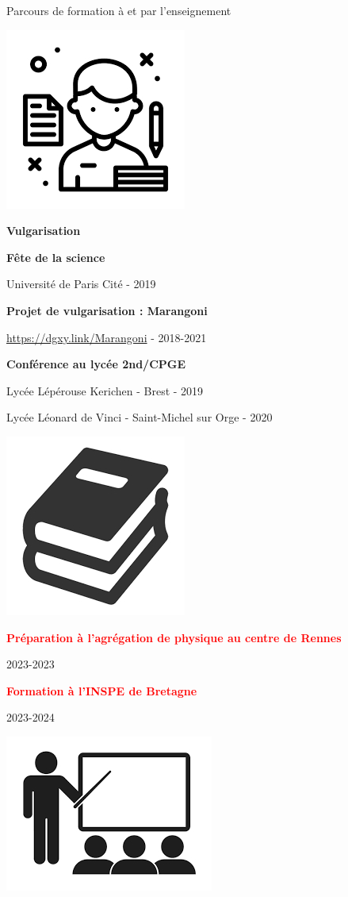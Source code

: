 \documentclass[aspectratio=169,10pt]{beamer}
\begin{document}
\begin{frame}{Parcours de formation à et par l'enseignement}
  \centering
  \begin{minipage}{.35\linewidth}
  \centering
  \includegraphics[width=.25\linewidth]{./figures/vulgarisation.jpg}\smallskip
  
  \textbf{\large Vulgarisation}\smallskip
  
  \textbf{Fête de la science}\smallskip

  Université de Paris Cité - 2019\smallskip
  
  \textbf{Projet de vulgarisation : Marangoni}\smallskip

  \url{https://dgxy.link/Marangoni} - 2018-2021\smallskip
  


  \textbf{Conférence au lycée 2nd/CPGE}\smallskip
  
  Lycée Lépérouse Kerichen - Brest - 2019\smallskip

  Lycée Léonard de Vinci - Saint-Michel sur Orge - 2020
  
  \end{minipage}\hfill
  \begin{minipage}{.25\linewidth}
    \centering
  \includegraphics[width=.25\linewidth]{./figures/etudes.jpg}\smallskip
  
  \textbf{\textcolor{red}{Préparation à l'agrégation de physique au centre de Rennes }}\smallskip
  
  2023-2023 \smallskip
  
  \textbf{\textcolor{red}{Formation à l'INSPE de Bretagne}}\smallskip
  
  2023-2024
  
  \end{minipage}\hfill
  \begin{minipage}{.35\linewidth}
    \centering
  \includegraphics[width=.25\linewidth]{./figures/enseignement.jpg}\smallskip
  

\end{minipage}
\end{frame}
\end{document}
